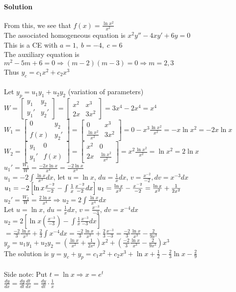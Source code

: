 \documentclass{article}
\newcommand{\mat}[4]{\begin{bmatrix} #1 & #2 \\ #3 & #4 \end{bmatrix}}
\begin{document}
\paragraph{Solution} From this, we see that $f(x)=\frac{\ln x^2}{x^2}$
\\The associated homogeneous equation is $x^2y''-4xy'+6y=0$
\\This is a CE with $a=1,\;b=-4,\;c=6$
\\The auxiliary equation is $m^2-5m+6=0\Rightarrow(m-2)(m-3)=0\Rightarrow m=2,3$
\\Thus $y_c=c_1x^2+c_2x^3$
\\\\Let $y_p=u_1y_1+u_2y_2$ (variation of parameters)
\\$W=\mat{y_1}{y_2}{y_1'}{y_2'}=\mat{x^2}{x^3}{2x}{3x^2}=3x^4-2x^4=x^4$
\\$W_1=\mat{0}{y_2}{f(x)}{y_2'}=\mat{0}{x^3}{\frac{\ln x^2}{x^2}}{3x^2}=0-x^3\frac{\ln x^2}{x^2}=-x\ln x^2=-2x\ln x$
\\$W_2=\mat{y_1}{0}{y_1'}{f(x)}=\mat{x^2}{0}{2x}{\frac{\ln x^2}{x^2}}=x^2\frac{\ln x^2}{x^2}=\ln x^2=2\ln x$
\\$u_1'=\frac{W_1}{W}=\frac{-2x\ln x}{x^4}=\frac{-2\ln x}{x^3}$
\\$u_1=-2\int\frac{\ln x}{x^3}dx$, let $u=\ln x$, $du=\frac{1}{x}dx$, $v=\frac{x^{-2}}{-2}, dv=x^{-3}dx$
\\$u_1=-2\left[\ln x\frac{x^{-2}}{-2}-\int\frac{1}{x}\frac{x^{-2}}{-2}dx\right]
\\u_1=\frac{\ln x}{x^2}-\frac{x^{-2}}{-2}=\frac{\ln x}{x^2}+\frac{1}{2x^2}$
\\$u_2'=\frac{W_2}{W}=\frac{2\ln x}{x^4}\Rightarrow u_2=2\int\frac{\ln x}{x^4}dx$
\\Let $u=\ln x$, $du=\frac{1}{x}dx$, $v=\frac{x^{-3}}{-3}$, $dv=x^{-4}dx$
\\$u_2=2\left[\ln x(\frac{x^{-3}}{-3})-\int\frac{1}{x}\frac{x^{-3}}{-3}dx\right]$
\\$=\frac{-2}{3}\frac{\ln x}{x^3}+\frac{2}{3}\int x^{-4}dx=\frac{-2}{3}\frac{\ln x}{x^3}+\frac{2}{3}\frac{x^{-3}}{-3}=\frac{-2}{3}\frac{\ln x}{x^3}-\frac{2}{9x^3}$
\\$y_p=u_1y_1+u_2y_2=(\frac{\ln x}{x^2}+\frac{1}{2x^2})x^2+(\frac{-2}{3}\frac{\ln x}{x^3}-\frac{2}{9x^3})x^3$
\\The solution is $y=y_c+y_p=c_1x^2+c_2x^3+\ln x+\frac{1}{2}-\frac{2}{3}\ln x-\frac{2}{9}$
\\\\Side note: Put $t=\ln x\Rightarrow x=e^t$
\\$\frac{dy}{dx}=\frac{dy}{dt}\frac{dt}{dx}=\frac{dy}{dt}\cdot\frac{1}{x}$
\end{document}
